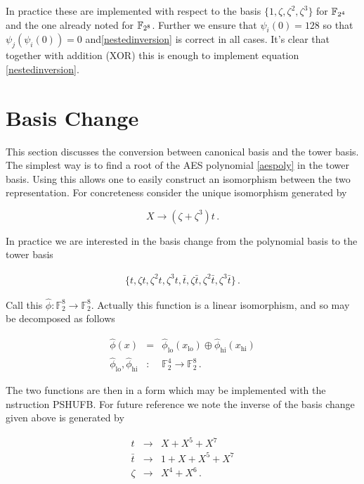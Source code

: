 \documentclass[a4paper]{article}
\numberwithin{equation}{section}
\begin{document}
In practice these are implemented with respect to the basis $\{ 1, \zeta, \zeta^2, \zeta^3 \}$ for $\mathbb{F}_{2^4}$ and the one already noted for $\mathbb{F}_{2^8}$. Further we ensure that $\psi_i(0) = 128$ so that $\psi_j(\psi_i(0)) = 0 $ and\eqref{nestedinversion} is correct in all cases. It's clear that together with addition (XOR) this is enough to implement equation \eqref{nestedinversion}.

\section{Basis Change}

This section discusses the conversion between canonical basis and the tower basis. The simplest way is to find a root of the AES polynomial \eqref{aespoly} in the tower basis. Using this allows one to easily construct an isomorphism between the two representation. For concreteness consider the unique isomorphism generated by

	$$ X \rightarrow \left( \zeta + \zeta^3 \right) t \,. $$

In practice we are interested in the basis change from the polynomial basis to the tower basis

\begin{eqnarray}
\{ t, \zeta t, \zeta^2 t , \zeta^3 t ,  \bar{t}, \zeta \bar{t}, \zeta^2 \bar{t} , \zeta^3 \bar{t} \} \, .
\end{eqnarray}

Call this $\hat{\phi} : \mathbb{F}^8_2 \rightarrow \mathbb{F}^8_2$. Actually this function is a linear isomorphism, and so may be decomposed as follows

\begin{eqnarray*}
	 \hat{\phi}(x) &=& \hat{\phi}_{\text{lo}} (x_{\text{lo}}) \oplus \hat{\phi}_{\text{hi}} (x_{\text{hi}}) \\
	\hat{\phi}_{\text{lo}}, \hat{\phi}_{\text{hi}} &:& \mathbb{F}^4_2 \rightarrow \mathbb{F}^8_2 \, .
\end{eqnarray*}

The two functions are then in a form which may be implemented with the nstruction PSHUFB. For future reference we note the inverse of the basis change given above is generated by

\begin{eqnarray*}
t &\rightarrow& X + X^5 + X^7 \\
\bar{t} &\rightarrow& 1 + X + X^5 + X^7 \\
\zeta &\rightarrow& X^4 + X^6 \, . 
\end{eqnarray*}
\end{document}
